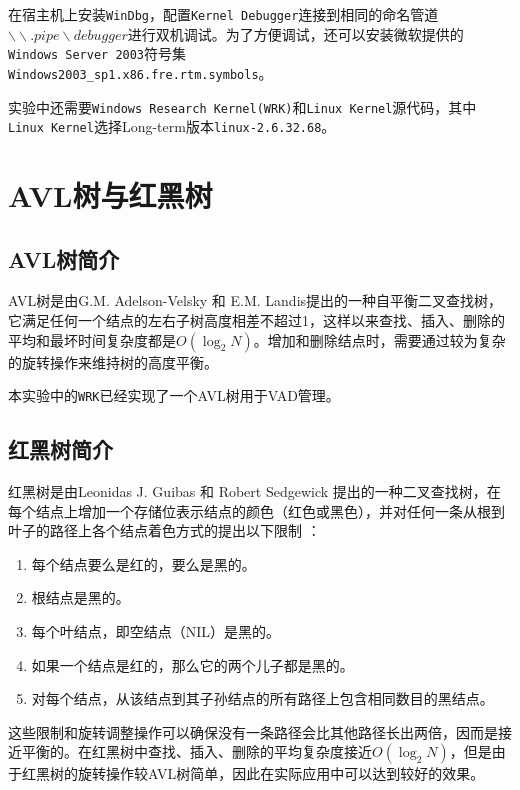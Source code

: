 \documentclass[a4paper, 11pt]{article}
\begin{document}
        在宿主机上安装\texttt{WinDbg}，配置\texttt{Kernel Debugger}连接到相同的命名管道$\backslash\backslash.pipe\backslash debugger$进行双机调试。为了方便调试，还可以安装微软提供的
        \texttt{Windows Server 2003}符号集\\
        \texttt{Windows2003\_sp1.x86.fre.rtm.symbols}。

        实验中还需要\texttt{Windows Research Kernel(WRK)}和\texttt{Linux Kernel}源代码，其中\texttt{Linux Kernel}选择Long-term版本\texttt{linux-2.6.32.68}。

    \section{AVL树与红黑树}
        \subsection{AVL树简介}
            AVL树是由G.M. Adelson-Velsky 和 E.M. Landis提出的一种自平衡二叉查找树，它满足任何一个结点的左右子树高度相差不超过1，这样以来查找、插入、删除的平均和最坏时间复杂度都是$O(\log_2 N)$。增加和删除结点时，需要通过较为复杂的旋转操作来维持树的高度平衡。
            
            本实验中的\texttt{WRK}已经实现了一个AVL树用于VAD管理。
            
        \subsection{红黑树简介}
            红黑树是由Leonidas J. Guibas 和 Robert Sedgewick 提出的一种二叉查找树，在每个结点上增加一个存储位表示结点的颜色（红色或黑色），并对任何一条从根到叶子的路径上各个结点着色方式的提出以下限制            \cite{IntroAlgor}：
            
            \begin{enumerate}
              \item 每个结点要么是红的，要么是黑的。
              \item 根结点是黑的。
              \item 每个叶结点，即空结点（NIL）是黑的。
              \item 如果一个结点是红的，那么它的两个儿子都是黑的。
              \item 对每个结点，从该结点到其子孙结点的所有路径上包含相同数目的黑结点。
            \end{enumerate}
            
            这些限制和旋转调整操作可以确保没有一条路径会比其他路径长出两倍，因而是接近平衡的。在红黑树中查找、插入、删除的平均复杂度接近$O(\log_2 N)$，但是由于红黑树的旋转操作较AVL树简单，因此在实际应用中可以达到较好的效果。
            
\end{document}
